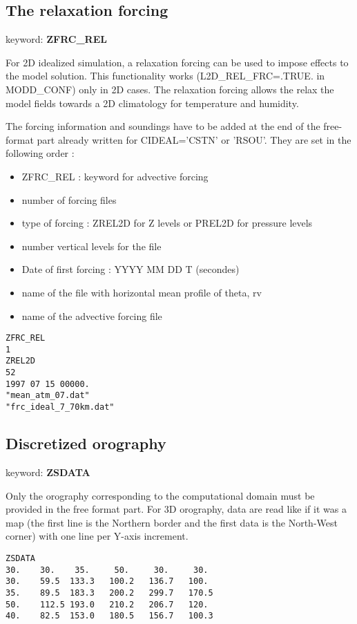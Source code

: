 \subsection{The relaxation forcing} \label{ss:rel_forcing}

keyword: {\bf ZFRC\_REL} 

For 2D idealized simulation, a relaxation forcing can be used to impose effects to the model solution. This functionality works (L2D\_REL\_FRC=.TRUE. in MODD\_CONF) only in 2D cases.  The relaxation forcing allows the relax the model fields towards a 2D climatology for temperature and humidity.
         
The forcing information and soundings have to be added at the end of the
free-format part already written for CIDEAL='CSTN' or 'RSOU'. They are set in the following order : 
\begin{itemize}
\item ZFRC\_REL : keyword for advective forcing
\item number of forcing files
\item type of forcing : ZREL2D for Z levels or PREL2D for  pressure levels
\item number vertical levels for the file
\item Date of first forcing : YYYY MM DD T (secondes)
\item name of the file with horizontal mean profile of theta, rv
\item name of the advective forcing file
\end{itemize}

                                   
\begin{verbatim}
ZFRC_REL
1
ZREL2D
52
1997 07 15 00000.
"mean_atm_07.dat"
"frc_ideal_7_70km.dat"
\end{verbatim}

\subsection{Discretized orography}

keyword: {\bf ZSDATA}

Only the orography corresponding to the computational domain must be
provided in the free format part. For 3D orography, data are read like if it
was a map (the first line is the Northern border and the first data
is the North-West corner) with one line per Y-axis increment.

\begin{verbatim}
ZSDATA
30.    30.    35.     50.     30.     30.
30.    59.5  133.3   100.2   136.7   100.
35.    89.5  183.3   200.2   299.7   170.5
50.    112.5 193.0   210.2   206.7   120.
40.    82.5  153.0   180.5   156.7   100.3
\end{verbatim}



